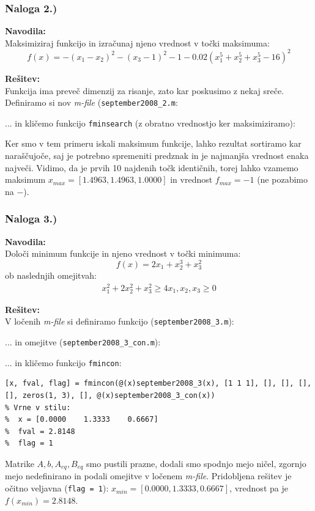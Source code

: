 \documentclass[a4paper,11pt]{article}
\begin{document}
\subsubsection{Naloga 2.)}

\textbf{Navodila:} \\ Maksimiziraj funkcijo in izračunaj njeno vrednost v točki maksimuma:
\begin{equation} \label{eq:september2008_2}
	f(x) = -(x_1 - x_2)^2 - (x_3 - 1)^2 - 1 - 0.02(x_1^5 + x_2^5 + x_3^5 - 16)^2
\end{equation}

\textbf{Rešitev:} \\
Funkcija ima preveč dimenzij za risanje, zato kar poskusimo z nekaj sreče. Definiramo si nov \textit{m-file} (\texttt{september2008\_2.m}:

... in kličemo funkcijo \texttt{fminsearch} (z obratno vrednostjo ker maksimiziramo):

Ker smo v tem primeru iskali maksimum funkcije, lahko rezultat sortiramo kar naraščujoče, saj je potrebno spremeniti predznak in je najmanjša vrednost enaka največi.
Vidimo, da je prvih 10 najdenih točk identičnih, torej lahko vzamemo maksimum $x_{max} = [1.4963, 1.4963, 1.0000]$ in vrednost $f_{max} = -1$ (ne pozabimo na $-$).


\subsubsection{Naloga 3.)}

\textbf{Navodila:} \\
Določi minimum funkcije in njeno vrednost v točki minimuma:
\begin{equation} \label{eq:september2008_3}
 	f(x) = 2x_1 +x_2^3 + x_3^2
\end{equation}
ob naslednjih omejitvah:
\begin{equation} \label{con:september2008_3}
	\begin{gathered}
		x_1^2 + 2x_2^2 +x_3^2 \geq 4
		x_1, x_2, x_3 \geq 0
	\end{gathered}
\end{equation}

\textbf{Rešitev:} \\
V ločenih \textit{m-file} si definiramo funkcijo (\texttt{september2008\_3.m}):

... in omejitve (\texttt{september2008\_3\_con.m}):

... in kličemo funkcijo \texttt{fmincon}:
\begin{lstlisting}
[x, fval, flag] = fmincon(@(x)september2008_3(x), [1 1 1], [], [], [], [], zeros(1, 3), [], @(x)september2008_3_con(x))
% Vrne v stilu:
%  x = [0.0000    1.3333    0.6667]
%  fval = 2.8148
%  flag = 1
\end{lstlisting}
Matrike $A, b, A_{eq}, B_{eq}$ smo pustili prazne, dodali smo spodnjo mejo ničel, zgornjo mejo nedefinirano in podali omejitve v ločenem \textit{m-file}.
Pridobljena rešitev je očitno veljavna (\texttt{flag = 1}): $x_{min} = [0.0000, 1.3333, 0.6667]$, vrednost pa je $f(x_{min}) = 2.8148$.
\end{document}
